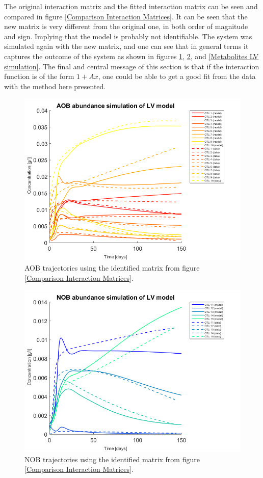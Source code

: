 \documentclass[3p,times]{elsarticle}
\begin{document}
\clearpage

The original interaction matrix and the fitted interaction matrix can be seen and compared in figure \eqref{Comparison Interaction Matrices}. It can be seen that the new matrix is very different from the original one, in both order of magnitude and sign. Implying that the model is probably not identifiable. The system was simulated again with the new matrix, and one can see that in general terms it captures the outcome of the system as shown in figures \ref{AOB LV simulation}, \ref{NOB LV simulation}, and \ref{Metabolites LV simulation}. The final and central message of this section is that if the interaction function is of the form $1+Ax$, one could be able to get a good fit from the data with the method here presented.



\begin{figure}
	\centering
	\includegraphics[width=0.5 \textwidth]{Synthetic_data_no_noise//221119_no_noise_iter_5_AOB_Iter_5_LV}
	\caption{AOB trajectories using the identified matrix from figure \eqref{Comparison Interaction Matrices}.}
	\label{AOB LV simulation}
\end{figure}


\begin{figure}
	\centering
	\includegraphics[width=0.5 \textwidth]{Synthetic_data_no_noise//221119_no_noise_iter_5_NOB_Iter_5_LV}
	\caption{NOB trajectories using the identified matrix from figure \eqref{Comparison Interaction Matrices}.}
	\label{NOB LV simulation}
\end{figure}
\end{document}
